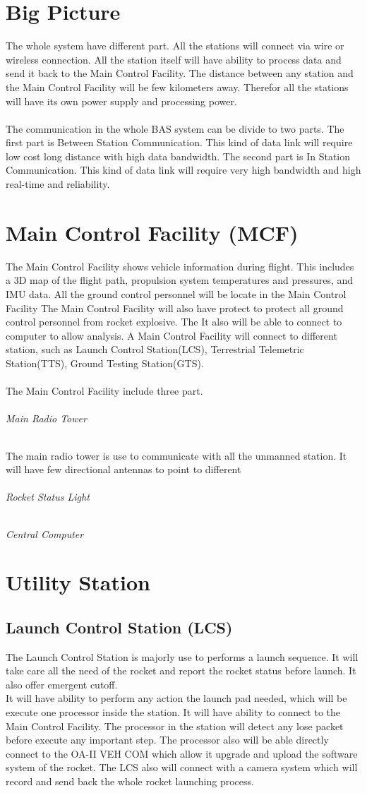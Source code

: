 \documentclass[12pt,article]{memoir}
\begin{document}
\chapter{Big Picture}
The whole system have different part. All the stations will connect via wire or wireless connection. All the station itself will have ability to process data and send it back to the Main Control Facility. The distance between any station and the Main Control Facility will be few kilometers away. Therefor all the stations will have its own power supply and processing power.\\\\
The communication in the whole BAS system can be divide to two parts. The first part is Between Station Communication. This kind of data link will require low cost long distance with high data bandwidth. The second part is In Station Communication. This kind of data link will require very high bandwidth and high real-time and reliability.
\newpage
\chapter{Main Control Facility (MCF)}
The Main Control Facility shows vehicle information during flight. This includes a 3D map of the flight path, propulsion system temperatures and pressures, and IMU data. All the ground control personnel will be locate in the Main Control Facility The Main Control Facility will also have protect to protect all ground control personnel from rocket explosive. The  It also will be able to connect to computer to allow analysis. A Main Control Facility will connect to different station, such as Launch Control Station(LCS), Terrestrial Telemetric Station(TTS), Ground Testing Station(GTS).\\\\
The Main Control Facility include three part.

\subparagraph{Main Radio Tower}
The main radio tower is use to communicate with all the unmanned station. It will have few directional antennas to point to different 
\subparagraph{Rocket Status Light}
\subparagraph{Central Computer}

\newpage
\chapter{Utility Station}
\section{Launch Control Station (LCS)}
The Launch Control Station is majorly use to performs a launch sequence. It will take care all the need of the rocket and report the rocket status before launch. It also offer emergent cutoff. \\
It will have ability to perform any action the launch pad needed, which will be execute one processor inside the station. It will have ability to connect to the Main Control Facility. The processor in the station will detect any lose packet before execute any important step. The processor also will be able directly connect to the OA-II VEH COM which allow it upgrade and upload the software system of the rocket. The LCS also will connect with a camera system which will record and send back the whole rocket launching process. 
\end{document}
